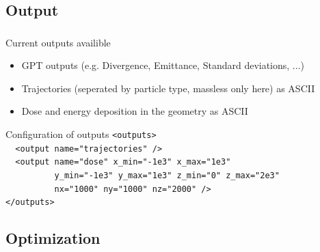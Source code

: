 \documentclass{beamer}
\newcommand{\ident}{\thesection.\thesubsection}
\newcommand{\mysubsection}[1]{\subsection{#1}\label{\ident}}
\newcommand{\ftitle}{\frametitle{\nameref{\ident}}}
\begin{document}
\mysubsection{Output}

\begin{frame}
	\ftitle
	\begin{block}{Current outputs availible}
		\begin{itemize}
			\item GPT outputs (e.g. Divergence, Emittance, Standard deviations, ...)
			\item Trajectories (seperated by particle type, massless only here) as ASCII
			\item Dose and energy deposition in the geometry as ASCII
		\end{itemize}
	\end{block}
	\pause
	\begin{exampleblock}{Configuration of outputs}
		\texttt{<outputs>\\
			~~<output name="trajectories" />\\
			~~<output name="dose" x\_min="-1e3" x\_max="1e3"\\
			~~~~~~~~~~y\_min="-1e3" y\_max="1e3" z\_min="0" z\_max="2e3"\\
			~~~~~~~~~~nx="1000" ny="1000" nz="2000" />\\
			</outputs>
		}
	\end{exampleblock}
\end{frame}

\mysubsection{Optimization}
\end{document}
